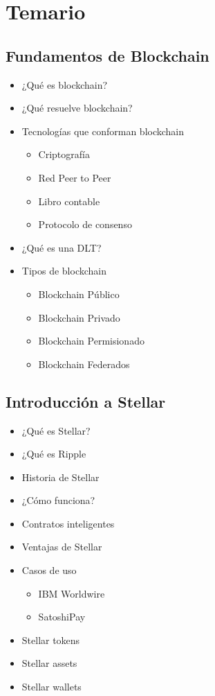 \documentclass[a4paper,12pt]{/home/armando/Documentos/Cursos/LaTeX/Plantillas/lib/pub}
\begin{document}
\section{Temario}
	\subsection{Fundamentos de Blockchain}
	\begin{itemize}
		\item ¿Qué es blockchain?
		\item ¿Qué resuelve blockchain?
		\item Tecnologías que conforman blockchain
		\begin{itemize}
			\item Criptografía
			\item Red Peer to Peer
			\item Libro contable
			\item Protocolo de consenso
		\end{itemize}
		\item ¿Qué es una DLT?
		\item Tipos de blockchain
		\begin{itemize}
			\item Blockchain Público
			\item Blockchain Privado
			\item Blockchain Permisionado
			\item Blockchain Federados
		\end{itemize}
	\end{itemize}
	\subsection{Introducción a Stellar}
	\begin{itemize}
		\item ¿Qué es Stellar?
		\item ¿Qué es Ripple
		\item Historia de Stellar
		\item ¿Cómo funciona?
		\item Contratos inteligentes
		\item Ventajas de Stellar
		\item Casos de uso
		\begin{itemize}
			\item IBM Worldwire
			\item SatoshiPay
		\end{itemize}
		\item Stellar tokens
		\item Stellar assets
		\item Stellar wallets
	\end{itemize}
\end{document}
